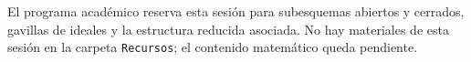 \begin{nota}
El programa académico reserva esta sesión para subesquemas abiertos y cerrados, gavillas de ideales y la estructura reducida asociada. No hay materiales de esta sesión en la carpeta \texttt{Recursos}; el contenido matemático queda pendiente.
\end{nota}
